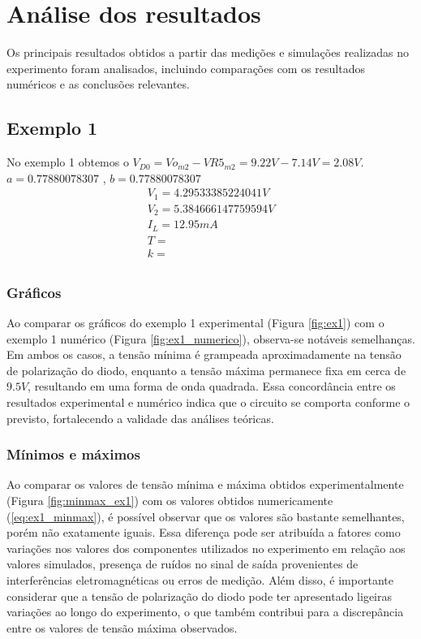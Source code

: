 \section{Análise dos resultados}

Os principais resultados obtidos a partir das medições e simulações realizadas no experimento foram analisados, incluindo comparações com os resultados numéricos e as conclusões relevantes.

\subsection{Exemplo 1}

No exemplo 1 obtemos o $V_{D0} = Vo_{m2} - VR5_{m2} = 9.22V - 7.14V = 2.08V$.
$a = 0.77880078307$ , $b = 0.77880078307$
\begin{equation}
    \begin{aligned}
        V_1 = 4.29533385224041 V  \\
        V_2 = 5.384666147759594 V \\
        I_L = 12.95 mA            \\
        T =                       \\
        k =                       \\
    \end{aligned}
\end{equation}

\subsubsection{Gráficos}

Ao comparar os gráficos do exemplo 1 experimental (Figura \ref{fig:ex1}) com o exemplo 1 numérico (Figura \ref{fig:ex1_numerico}), observa-se notáveis semelhanças. Em ambos os casos, a tensão mínima é grampeada aproximadamente na tensão de polarização do diodo, enquanto a tensão máxima permanece fixa em cerca de $9.5V$, resultando em uma forma de onda quadrada. Essa concordância entre os resultados experimental e numérico indica que o circuito se comporta conforme o previsto, fortalecendo a validade das análises teóricas.

\subsubsection{Mínimos e máximos}

Ao comparar os valores de tensão mínima e máxima obtidos experimentalmente (Figura \ref{fig:minmax_ex1}) com os valores obtidos numericamente (\ref{eq:ex1_minmax}), é possível observar que os valores são bastante semelhantes, porém não exatamente iguais. Essa diferença pode ser atribuída a fatores como variações nos valores dos componentes utilizados no experimento em relação aos valores simulados, presença de ruídos no sinal de saída provenientes de interferências eletromagnéticas ou erros de medição. Além disso, é importante considerar que a tensão de polarização do diodo pode ter apresentado ligeiras variações ao longo do experimento, o que também contribui para a discrepância entre os valores de tensão máxima observados.

